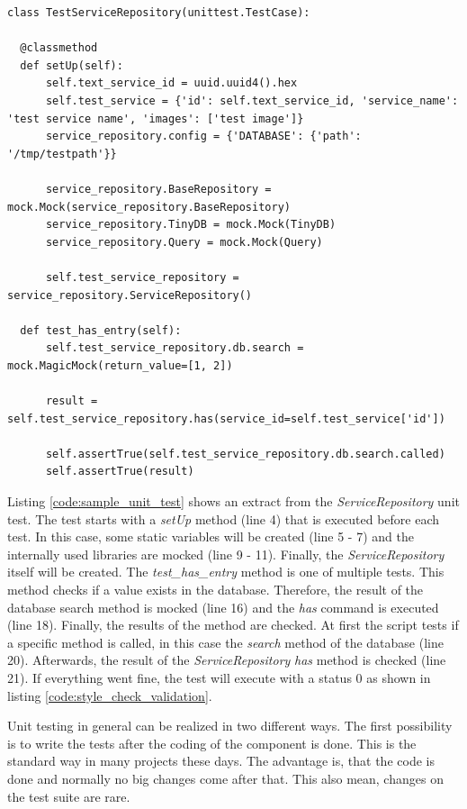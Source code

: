 \begin{verbatim}
class TestServiceRepository(unittest.TestCase):

  @classmethod
  def setUp(self):
      self.text_service_id = uuid.uuid4().hex
      self.test_service = {'id': self.text_service_id, 'service_name': 'test service name', 'images': ['test image']}
      service_repository.config = {'DATABASE': {'path': '/tmp/testpath'}}

      service_repository.BaseRepository = mock.Mock(service_repository.BaseRepository)
      service_repository.TinyDB = mock.Mock(TinyDB)
      service_repository.Query = mock.Mock(Query)

      self.test_service_repository = service_repository.ServiceRepository()

  def test_has_entry(self):
      self.test_service_repository.db.search = mock.MagicMock(return_value=[1, 2])

      result = self.test_service_repository.has(service_id=self.test_service['id'])

      self.assertTrue(self.test_service_repository.db.search.called)
      self.assertTrue(result)
\end{verbatim}
\vspace{0.5cm}

Listing \ref{code:sample_unit_test} shows an extract from the \textit{ServiceRepository} unit test.
The test starts with a \textit{setUp} method (line 4) that is executed before each test.
In this case, some static variables will be created (line 5 - 7) and the internally used libraries are mocked (line 9 - 11).
Finally, the \textit{ServiceRepository} itself will be created.
The \textit{test\_has\_entry} method is one of multiple tests.
This method checks if a value exists in the database.
Therefore, the result of the database search method is mocked (line 16) and the \textit{has} command is executed (line 18).
Finally, the results of the method are checked.
At first the script tests if a specific method is called, in this case the \textit{search} method of the database (line 20).
Afterwards, the result of the \textit{ServiceRepository} \textit{has} method is checked (line 21).
If everything went fine, the test will execute with a status 0 as shown in listing \ref{code:style_check_validation}.\newline

Unit testing in general can be realized in two different ways.
The first possibility is to write the tests after the coding of the component is done.
This is the standard way in many projects these days.
The advantage is, that the code is done and normally no big changes come after that.
This also mean, changes on the test suite are rare.\newline

